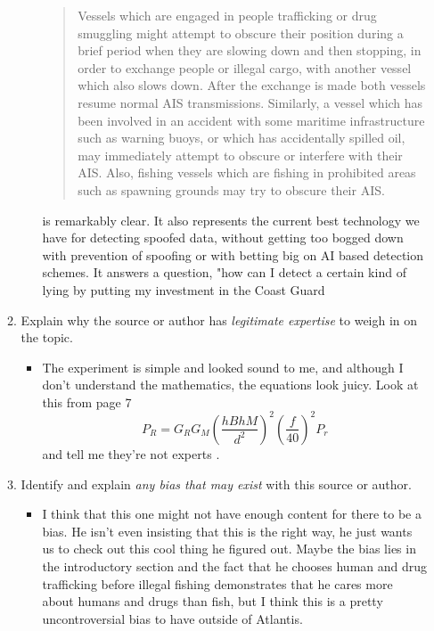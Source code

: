 \documentclass[12pt]{texMemo} %
\begin{document}
\begin{enumerate}
\begin{enumerate}
\begin{itemize}
\begin{quote}
                Vessels which are engaged in people trafficking or drug smuggling might attempt to obscure their position during a brief period when they are slowing down and then stopping, in order to exchange people or illegal cargo, with another vessel which also slows down. After the exchange is made both vessels resume normal AIS transmissions. Similarly, a vessel which has been involved in an accident with some maritime infrastructure such as warning buoys, or which has accidentally spilled oil, may immediately attempt to obscure or interfere with their AIS. Also, fishing vessels which are fishing in prohibited areas such as spawning grounds may try to obscure their AIS. \parencite[p 2]{kelly_novel_2022} 
            \end{quote} is remarkably clear. It also represents the current best technology we have for detecting spoofed data, without getting too bogged down with prevention of spoofing or with betting big on AI based detection schemes. It answers a question, "how can I detect a certain kind of lying by putting my investment in the Coast Guard
        \end{itemize}
    \item Explain why the source or author has \emph{legitimate expertise} to weigh in on the topic.
        \begin{itemize}
            \item The experiment is simple and looked sound to me, and although I don't understand the mathematics, the equations look juicy. Look at this from page 7
            \begin{equation*}
                P_R=G_RG_M \left(\frac{hB hM}{d^2}\right)^2\left(\frac{f}{40}\right)^2P_r
            \end{equation*} and tell me they're not experts \autocite{kelly_novel_2022}.
        \end{itemize}
    \item Identify and explain \emph{any bias that may exist} with this source or author.
        \begin{itemize}
            \item I think that this one might not have enough content for there to be a bias. He isn't even insisting that this is the right way, he just wants us to check out this cool thing he figured out. Maybe the bias lies in the introductory section and the fact that he chooses human and drug trafficking before illegal fishing demonstrates that he cares more about humans and drugs than fish, but I think this is a pretty uncontroversial bias to have outside of Atlantis.

\end{itemize}
\end{enumerate}
\end{enumerate}
\end{document}
